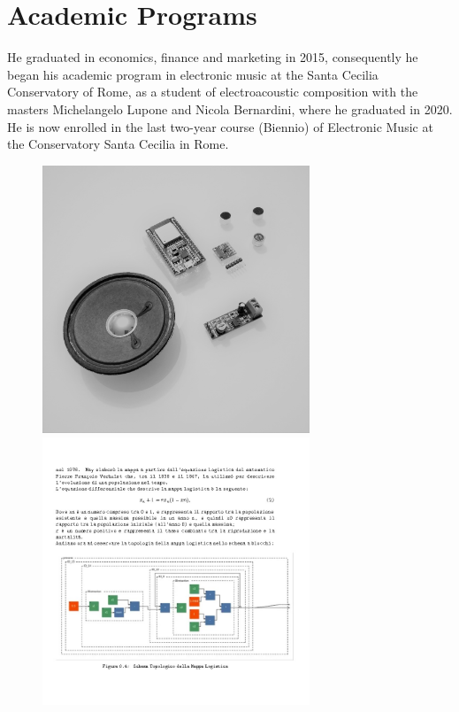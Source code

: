 \documentclass[12pt,landscape]{article}
\begin{document}
{\begin{center}
\begin{figure}[!htb]
\endminipage
\end{figure}

\clearpage


\section*{Academic Programs}

He graduated in economics, finance and marketing in 2015,
\newline
consequently he began his academic program in electronic music
\newline
at the Santa Cecilia Conservatory of Rome, as a student of electroacoustic composition 
\newline
with the masters Michelangelo Lupone and Nicola Bernardini, 
where he graduated in 2020.
\newline
He is now enrolled in the last two-year course (Biennio)
of Electronic Music at the Conservatory Santa Cecilia in Rome.

\begin{figure}[!htb]
  \includegraphics[width=8cm]{electroac1.jpg}

\endminipage\hfill
{}
  \includegraphics[width=8cm]{info1.jpg}


\end{figure}
\end{center}}
\end{document}
